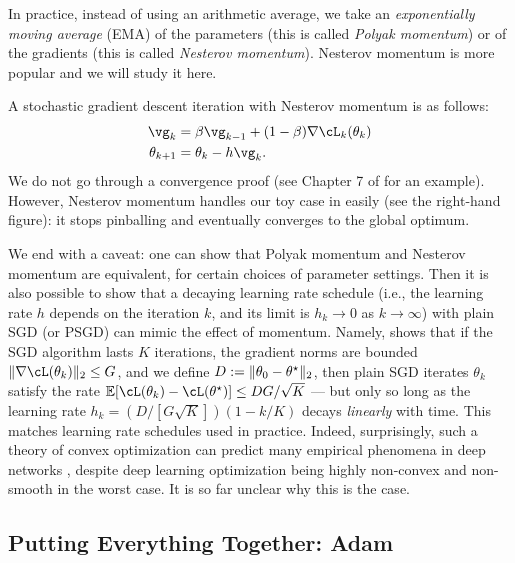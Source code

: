 \documentclass[../../book-main.tex]{subfiles}
\begin{document}
In practice, instead of using an arithmetic average, we take an \textit{exponentially moving average} (EMA) of the parameters (this is called \textit{Polyak momentum}) or of the gradients (this is called \textit{Nesterov momentum}). Nesterov momentum is more popular and we will study it here.

A stochastic gradient descent iteration with Nesterov momentum is as follows:
\begin{align}
    \vg_{k}
    &= \beta\vg_{k - 1} + (1 - \beta)\nabla \cL_{k}(\theta_{k}) \\ 
    \theta_{k + 1}
    &= \theta_{k} - h\vg_{k}.
\end{align}
We do not go through a convergence proof (see Chapter 7 of \cite{garrigos2023handbook} for an example). However, Nesterov momentum handles our toy case in  easily (see the right-hand figure): it stops pinballing and eventually converges to the global optimum.

We end with a caveat: one can show that Polyak momentum and Nesterov momentum are equivalent, for certain choices of parameter settings. Then it is also possible to show that a decaying learning rate schedule (i.e., the learning rate \(h\) depends on the iteration \(k\), and its limit is \(h_{k} \to 0\) as \(k \to \infty\)) with plain SGD (or PSGD) can mimic the effect of momentum. Namely, \cite{defazio2023optimal} shows that if the SGD algorithm lasts \(K\) iterations, the gradient norms are bounded \(\norm{\nabla \cL(\theta_{k})}_{2} \leq G\), and we define \(D := \norm{\theta_{0} - \theta^{\star}}_{2}\), then plain SGD iterates \(\theta_{k}\) satisfy the rate \(\Ex[\cL(\theta_{k}) - \cL(\theta^{\star})] \leq DG/\sqrt{K}\) --- but only so long as the learning rate \(h_{k} = (D/[G\sqrt{K}])(1 - k/K)\) decays \textit{linearly} with time. This matches learning rate schedules used in practice. Indeed, surprisingly, such a theory of convex optimization can predict many empirical phenomena in deep networks \cite{schaipp2025surprising}, despite deep learning optimization being highly non-convex and non-smooth in the worst case. It is so far unclear why this is the case.


\subsection{Putting Everything Together: Adam}
\end{document}
